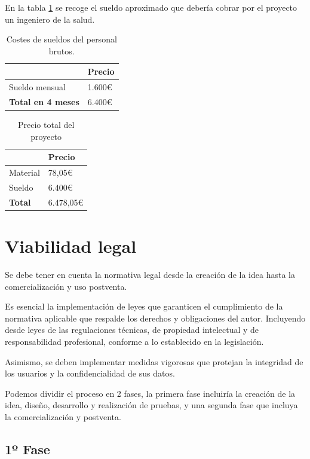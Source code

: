 En la tabla \ref{tab:costes_personal} se recoge el sueldo aproximado que debería cobrar por el proyecto un ingeniero de la salud.

\begin{table}[h]
\centering
\begin{tabular}{|l|l|}
\hline
\rowcolor[HTML]{BFBFBF} 
\textbf{} & \textbf{Precio} \\ \hline
Sueldo mensual & 1.600€ \\ \hline
\textbf{Total en 4 meses }& 6.400€ \\ \hline
\end{tabular}
\caption{Costes de sueldos del personal brutos.}
\label{tab:costes_personal}
\end{table}

\begin{table}[h]
\centering
\begin{tabular}{|l|l|}
\hline
\rowcolor[HTML]{BFBFBF} 
\textbf{} & \textbf{Precio} \\ \hline
Material & 78,05€ \\ \hline
Sueldo  &  6.400€ \\ \hline
\textbf{Total }& 6.478,05€ \\ \hline
\end{tabular}
\caption{Precio total del proyecto}
\label{tab:Costes Totales}
\end{table}

\section{Viabilidad legal}
Se debe tener en cuenta la normativa legal desde la creación de la idea hasta la comercialización y uso postventa.

Es esencial la implementación de leyes que garanticen el cumplimiento de la normativa aplicable que respalde los derechos y obligaciones del autor. Incluyendo desde leyes de las regulaciones técnicas, de propiedad intelectual y de responsabilidad profesional, conforme a lo establecido en la legislación.

Asimismo, se deben implementar medidas vigorosas que protejan la integridad de los usuarios y la confidencialidad de sus datos. 

Podemos dividir el proceso en 2 fases, la primera fase incluiría la creación de la idea, diseño, desarrollo y realización de pruebas, y una segunda fase que incluya la comercialización y postventa.

\subsection{1º Fase}

